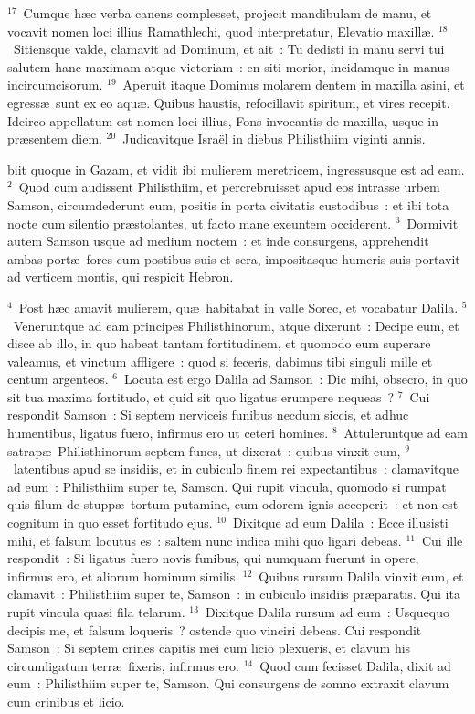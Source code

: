 ${}^{17}$~Cumque h\ae c verba canens complesset, projecit mandibulam de manu, et vocavit nomen loci illius Ramathlechi, quod interpretatur, Elevatio maxill\ae .
${}^{18}$~Sitiensque valde, clamavit ad Dominum, et ait~: Tu dedisti in manu servi tui salutem hanc maximam atque victoriam~: en siti morior, incidamque in manus incircumcisorum.
${}^{19}$~Aperuit itaque Dominus molarem dentem in maxilla asini, et egress\ae\ sunt ex eo aqu\ae . Quibus haustis, refocillavit spiritum, et vires recepit. Idcirco appellatum est nomen loci illius, Fons invocantis de maxilla, usque in pr\ae sentem diem.
${}^{20}$~Judicavitque Isra\"el in diebus Philisthiim viginti annis.

\bchapter
{}biit quoque in Gazam, et vidit ibi mulierem meretricem, ingressusque est ad eam.
${}^{2}$~Quod cum audissent Philisthiim, et percrebruisset apud eos intrasse urbem Samson, circumdederunt eum, positis in porta civitatis custodibus~: et ibi tota nocte cum silentio pr\ae stolantes, ut facto mane exeuntem occiderent.
${}^{3}$~Dormivit autem Samson usque ad medium noctem~: et inde consurgens, apprehendit ambas port\ae\ fores cum postibus suis et sera, impositasque humeris suis portavit ad verticem montis, qui respicit Hebron.


${}^{4}$~Post h\ae c amavit mulierem, qu\ae\ habitabat in valle Sorec, et vocabatur Dalila.
${}^{5}$~Veneruntque ad eam principes Philisthinorum, atque dixerunt~: Decipe eum, et disce ab illo, in quo habeat tantam fortitudinem, et quomodo eum superare valeamus, et vinctum affligere~: quod si feceris, dabimus tibi singuli mille et centum argenteos.
${}^{6}$~Locuta est ergo Dalila ad Samson~: Dic mihi, obsecro, in quo sit tua maxima fortitudo, et quid sit quo ligatus erumpere nequeas~?
${}^{7}$~Cui respondit Samson~: Si septem nerviceis funibus necdum siccis, et adhuc humentibus, ligatus fuero, infirmus ero ut ceteri homines.
${}^{8}$~Attuleruntque ad eam satrap\ae\ Philisthinorum septem funes, ut dixerat~: quibus vinxit eum,
${}^{9}$~latentibus apud se insidiis, et in cubiculo finem rei expectantibus~: clamavitque ad eum~: Philisthiim super te, Samson. Qui rupit vincula, quomodo si rumpat quis filum de stupp\ae\ tortum putamine, cum odorem ignis acceperit~: et non est cognitum in quo esset fortitudo ejus.
${}^{10}$~Dixitque ad eum Dalila~: Ecce illusisti mihi, et falsum locutus es~: saltem nunc indica mihi quo ligari debeas.
${}^{11}$~Cui ille respondit~: Si ligatus fuero novis funibus, qui numquam fuerunt in opere, infirmus ero, et aliorum hominum similis.
${}^{12}$~Quibus rursum Dalila vinxit eum, et clamavit~: Philisthiim super te, Samson~: in cubiculo insidiis pr\ae paratis. Qui ita rupit vincula quasi fila telarum.
${}^{13}$~Dixitque Dalila rursum ad eum~: Usquequo decipis me, et falsum loqueris~? ostende quo vinciri debeas. Cui respondit Samson~: Si septem crines capitis mei cum licio plexueris, et clavum his circumligatum terr\ae\ fixeris, infirmus ero.
${}^{14}$~Quod cum fecisset Dalila, dixit ad eum~: Philisthiim super te, Samson. Qui consurgens de somno extraxit clavum cum crinibus et licio.


